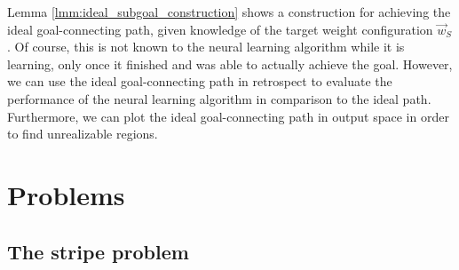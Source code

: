 \begin{remark}
    Lemma \ref{lmm:ideal_subgoal_construction} shows a construction for achieving the ideal goal-connecting path, given knowledge of the target weight configuration $\vec{w}_S$.
    Of course, this is not known to the neural learning algorithm while it is learning, only once it finished and was able to actually achieve the goal. 
    However, we can use the ideal goal-connecting path in retrospect to evaluate the performance of the neural learning algorithm in comparison to the ideal path.
    Furthermore, we can plot the ideal goal-connecting path in output space in order to find unrealizable regions.
\end{remark}

\chapter{Problems}
\section{The stripe problem}
\label{sec:stripe_problem}

